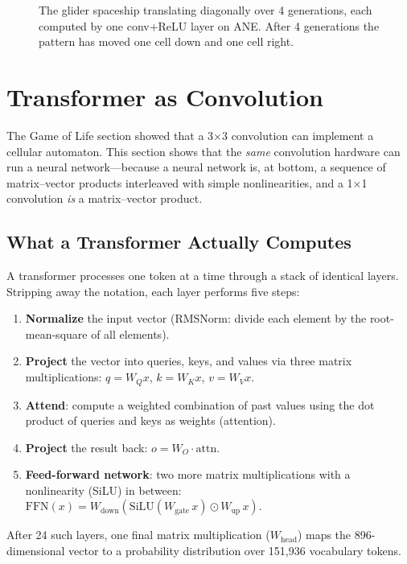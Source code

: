 \documentclass[11pt,twocolumn]{article}
\begin{document}
\begin{figure}[t]
\begin{tikzpicture}[scale=0.38, every node/.style={minimum size=0.38cm, inner sep=0pt}]
\end{tikzpicture}
\caption{The glider spaceship translating diagonally over 4
generations, each computed by one conv+ReLU layer on ANE. After 4
generations the pattern has moved one cell down and one cell right.}
\label{fig:gol_glider}
\end{figure}


\section{Transformer as Convolution}
\label{sec:transformer}

The Game of Life section showed that a 3$\times$3 convolution can
implement a cellular automaton.  This section shows that the
\emph{same} convolution hardware can run a neural network---because a
neural network is, at bottom, a sequence of matrix--vector products
interleaved with simple nonlinearities, and a 1$\times$1 convolution
\emph{is} a matrix--vector product.

\subsection{What a Transformer Actually Computes}

A transformer processes one token at a time through a stack of
identical layers.  Stripping away the notation, each layer performs
five steps:

\begin{enumerate}
\item \textbf{Normalize} the input vector (RMSNorm: divide each
  element by the root-mean-square of all elements).
\item \textbf{Project} the vector into queries, keys, and values via
  three matrix multiplications: $q = W_Q x$, $k = W_K x$, $v = W_V x$.
\item \textbf{Attend}: compute a weighted combination of past values
  using the dot product of queries and keys as weights (attention).
\item \textbf{Project} the result back: $o = W_O \cdot \mathrm{attn}$.
\item \textbf{Feed-forward network}: two more matrix multiplications
  with a nonlinearity (SiLU) in between:
  $\mathrm{FFN}(x) = W_\text{down}(\mathrm{SiLU}(W_\text{gate}\, x) \odot W_\text{up}\, x)$.
\end{enumerate}

After 24 such layers, one final matrix multiplication
($W_\text{head}$) maps the 896-dimensional vector to a probability
distribution over 151{,}936 vocabulary tokens.
\end{document}
